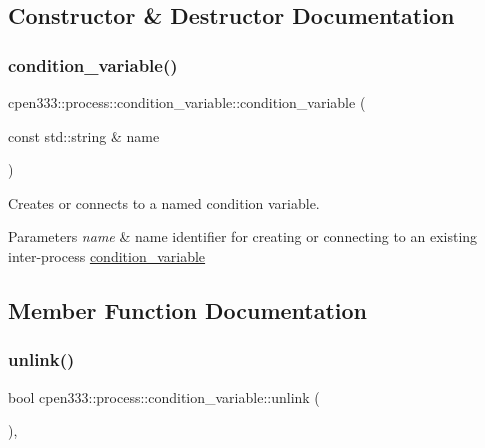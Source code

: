 \subsection{Constructor \& Destructor Documentation}
\mbox{\label{classcpen333_1_1process_1_1condition__variable_a7f43a5fdf856a56f1e992117fc4e45c3}} 
\subsubsection{\texorpdfstring{condition\+\_\+variable()}{condition\_variable()}}
{\footnotesize\ttfamily cpen333\+::process\+::condition\+\_\+variable\+::condition\+\_\+variable (\begin{DoxyParamCaption}\item[{const std\+::string \&}]{name }\end{DoxyParamCaption})\hspace{0.3cm}{\ttfamily [inline]}}



Creates or connects to a named condition variable. 


\begin{DoxyParams}{Parameters}
{\em name} & name identifier for creating or connecting to an existing inter-\/process \hyperlink{classcpen333_1_1process_1_1condition__variable}{condition\+\_\+variable} \\
\hline
\end{DoxyParams}


\subsection{Member Function Documentation}
\mbox{\label{classcpen333_1_1process_1_1condition__variable_a2861ec071acc52be7ca5790edd062ee8}} 
\subsubsection{\texorpdfstring{unlink()}{unlink()}\hspace{0.1cm}{\footnotesize\ttfamily [1/2]}}
{\footnotesize\ttfamily bool cpen333\+::process\+::condition\+\_\+variable\+::unlink (\begin{DoxyParamCaption}{ }\end{DoxyParamCaption})\hspace{0.3cm}{\ttfamily [inline]}, {\ttfamily [virtual]}}



